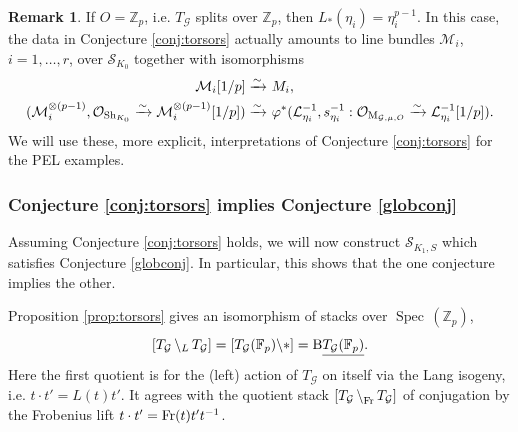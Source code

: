\documentclass[reqno, 10pt]{amsart}
\newcommand{\BF}{\ensuremath{\mathbb {F}}\xspace}
\newcommand{\BZ}{\ensuremath{\mathbb {Z}}\xspace}
\newcommand{\CG}{\ensuremath{\mathcal {G}}\xspace}
\newcommand{\CL}{\ensuremath{\mathcal {L}}\xspace}
\newcommand{\CM}{\ensuremath{\mathcal {M}}\xspace}
\newcommand{\CO}{\ensuremath{\mathcal {O}}\xspace}
\newcommand{\CS}{\ensuremath{\mathcal {S}}\xspace}
\newcommand{\RB}{\ensuremath{\mathrm {B}}\xspace}
\DeclareMathOperator{\Spec}{Spec\,}
\newcommand{\bs}{\backslash}
\theoremstyle{definition}
\newtheorem{remark}[subsubsection]{Remark}
\numberwithin{equation}{subsection}
\numberwithin{subsubsection}{subsection}
\newcommand{\und}{\underline}
\newcommand{\Mloc}{{\rm M}}
\newcommand{\LBS}{\, {\bs}_{\vphantom{A}{L}}\, }
\begin{document}
\begin{remark}
 If $O=\BZ_p$, i.e. $T_\CG$ splits over $\BZ_p$, then $L_*(\eta_i)=\eta^{p-1}_i$. In this case, 
 the data in Conjecture \ref{conj:torsors} actually  amounts to 
 line bundles $\CM_i$, $i=1,\ldots, r$, over $\CS_{K_0}$ together with isomorphisms
 \begin{align}\begin{split}\label{data2}
 \CM_i[1/p]\xrightarrow{\sim}&\ M_i,\\
  (\CM_{i}^{\otimes(p-1)}, \CO_{{\rm Sh}_{K_0}}\xrightarrow{\sim} \CM_{i}^{\otimes(p-1)}[1/p])\xrightarrow{\sim}&\ 
 \varphi^* (\CL_{\eta_i}^{-1}, s_{\eta_i}^{-1}: \CO_{\Mloc_{\CG,\mu, O}}\xrightarrow{\sim} \CL^{-1}_{\eta_i}[1/p]).
 \end{split}\end{align}
We will use these, more explicit, interpretations of Conjecture \ref{conj:torsors} for the PEL examples.
 \end{remark}
 
 
 
\subsubsection{Conjecture  \ref{conj:torsors} implies Conjecture  \ref{globconj}}
\label{sss:ConjImplyConj} Assuming Conjecture \ref{conj:torsors} holds, we will now  construct $\CS_{K_1, S}$
which satisfies Conjecture \ref{globconj}. In particular, this shows that the one conjecture implies the other.



Proposition \ref{prop:torsors} gives an isomorphism  of stacks over $\Spec(\BZ_p)$,
 \[
 [T_\CG  \LBS T_\CG ]=[T_\CG  (\BF_p)\bs *]=\RB  \und{T_\CG(\BF_p)} .
\]
Here the first quotient is for the (left) action of $T_\CG $ on itself via the Lang isogeny, i.e. $t\cdot t'=L(t)t'$. 
It agrees with the quotient stack $ [T_\CG\,  \bs_{\vphantom{A^1}{\rm Fr}}\, T_\CG ]$ of   conjugation   by the Frobenius lift $t\cdot t'={\rm Fr}(t)t't^{-1}$.
\end{document}
